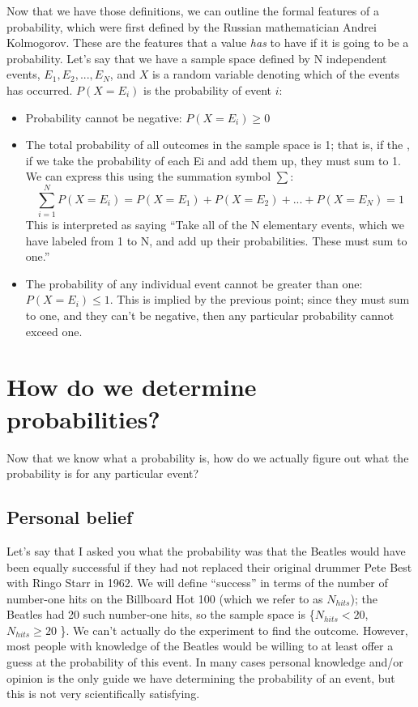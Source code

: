 \documentclass[12pt,]{book}
\providecommand{\tightlist}{%
  \setlength{\itemsep}{0pt}\setlength{\parskip}{0pt}}
\theoremstyle{definition}
\theoremstyle{definition}
\theoremstyle{definition}
\theoremstyle{remark}
\begin{document}
Now that we have those definitions, we can outline the formal features of a probability, which were first defined by the Russian mathematician Andrei Kolmogorov. These are the features that a value \emph{has} to have if it is going to be a probability. Let's say that we have a sample space defined by N independent events, \({E_1, E_2, ... , E_N}\), and \(X\) is a random variable denoting which of the events has occurred. \(P(X=E_i)\) is the probability of event \(i\):

\begin{itemize}
\tightlist
\item
  Probability cannot be negative: \(P(X=E_i) \ge 0\)
\item
  The total probability of all outcomes in the sample space is 1; that is, if the , if we take the probability of each Ei and add them up, they must sum to 1. We can express this using the summation symbol \(\sum\):
  \[
  \sum_{i=1}^N{P(X=E_i)} = P(X=E_1) + P(X=E_2) + ... + P(X=E_N) = 1
  \]
  This is interpreted as saying ``Take all of the N elementary events, which we have labeled from 1 to N, and add up their probabilities. These must sum to one.''\\
\item
  The probability of any individual event cannot be greater than one: \(P(X=E_i)\le 1\). This is implied by the previous point; since they must sum to one, and they can't be negative, then any particular probability cannot exceed one.
\end{itemize}

\hypertarget{how-do-we-determine-probabilities}{%
\section{How do we determine probabilities?}\label{how-do-we-determine-probabilities}}

Now that we know what a probability is, how do we actually figure out what the probability is for any particular event?

\hypertarget{personal-belief}{%
\subsection{Personal belief}\label{personal-belief}}

Let's say that I asked you what the probability was that the Beatles would have been equally successful if they had not replaced their original drummer Pete Best with Ringo Starr in 1962. We will define ``success'' in terms of the number of number-one hits on the Billboard Hot 100 (which we refer to as \(N_{hits}\)); the Beatles had 20 such number-one hits, so the sample space is \{\(N_{hits} < 20\),\(N_{hits} \ge 20\) \}. We can't actually do the experiment to find the outcome. However, most people with knowledge of the Beatles would be willing to at least offer a guess at the probability of this event. In many cases personal knowledge and/or opinion is the only guide we have determining the probability of an event, but this is not very scientifically satisfying.
\end{document}
